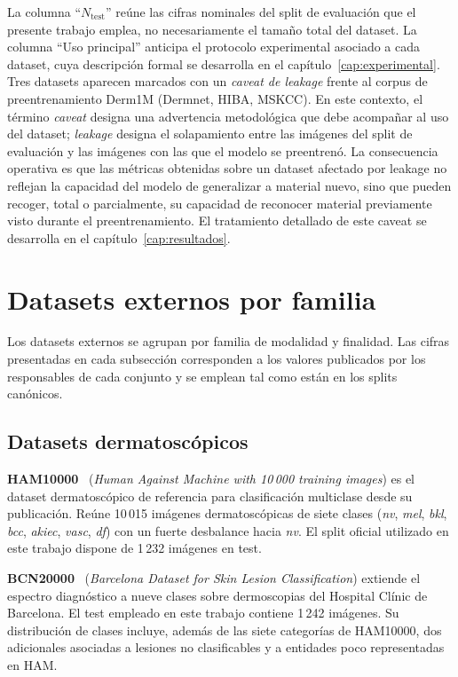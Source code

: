 La columna ``$N_{\mathrm{test}}$'' reúne las cifras nominales del
split de evaluación que el presente trabajo emplea, no necesariamente
el tamaño total del dataset. La columna ``Uso principal'' anticipa el
protocolo experimental asociado a cada dataset, cuya descripción
formal se desarrolla en el capítulo~\ref{cap:experimental}. Tres
datasets aparecen marcados con un \emph{caveat de leakage} frente al
corpus de preentrenamiento Derm1M (Dermnet, HIBA, MSKCC). En este
contexto, el término \emph{caveat} designa una advertencia
metodológica que debe acompañar al uso del dataset; \emph{leakage}
designa el solapamiento entre las imágenes del split de evaluación y
las imágenes con las que el modelo se preentrenó. La consecuencia
operativa es que las métricas obtenidas sobre un dataset afectado por
leakage no reflejan la capacidad del modelo de generalizar a material
nuevo, sino que pueden recoger, total o parcialmente, su capacidad de
reconocer material previamente visto durante el preentrenamiento. El
tratamiento detallado de este caveat se desarrolla en el
capítulo~\ref{cap:resultados}.

\section{Datasets externos por familia}
\label{sec:datasets-externos}

Los datasets externos se agrupan por familia de modalidad y
finalidad. Las cifras presentadas en cada subsección corresponden a
los valores publicados por los responsables de cada conjunto y se
emplean tal como están en los splits canónicos.

\subsection{Datasets dermatoscópicos}
\label{sec:datasets-dermo}

\textbf{HAM10000}~\cite{ham10000} (\emph{Human Against Machine with
10\,000 training images}) es el dataset dermatoscópico de referencia
para clasificación multiclase desde su publicación. Reúne 10\,015
imágenes dermatoscópicas de siete clases (\emph{nv}, \emph{mel},
\emph{bkl}, \emph{bcc}, \emph{akiec}, \emph{vasc}, \emph{df}) con un
fuerte desbalance hacia \emph{nv}. El split oficial utilizado en este
trabajo dispone de 1\,232 imágenes en test.

\textbf{BCN20000}~\cite{bcn20000} (\emph{Barcelona Dataset for Skin
Lesion Classification}) extiende el espectro diagnóstico a nueve
clases sobre dermoscopias del Hospital Clínic de Barcelona. El test
empleado en este trabajo contiene 1\,242 imágenes. Su distribución de
clases incluye, además de las siete categorías de HAM10000, dos
adicionales asociadas a lesiones no clasificables y a entidades poco
representadas en HAM.

